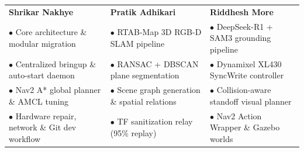 \documentclass[8pt,a4paper]{article}
\begin{document}
\begin{tcolorbox}[title={Team Contributions \& Work Package Breakdown}, colback=white]
    \begin{tabularx}{\textwidth}{@{} X X X @{}}
        \textbf{\color{steelBlue}\fontsize{7.2}{8.2}\selectfont Shrikar Nakhye} & 
        \textbf{\color{steelBlue}\fontsize{7.2}{8.2}\selectfont Pratik Adhikari} & 
        \textbf{\color{steelBlue}\fontsize{7.2}{8.2}\selectfont Riddhesh More} \\
        {\fontsize{6.3}{7.4}\selectfont $\bullet$ Core architecture \& modular migration} & 
        {\fontsize{6.3}{7.4}\selectfont $\bullet$ RTAB-Map 3D RGB-D SLAM pipeline} & 
        {\fontsize{6.3}{7.4}\selectfont $\bullet$ DeepSeek-R1 + SAM3 grounding pipeline} \\
        {\fontsize{6.3}{7.4}\selectfont $\bullet$ Centralized bringup \& auto-start daemon} & 
        {\fontsize{6.3}{7.4}\selectfont $\bullet$ RANSAC + DBSCAN plane segmentation} & 
        {\fontsize{6.3}{7.4}\selectfont $\bullet$ Dynamixel XL430 SyncWrite controller} \\
        {\fontsize{6.3}{7.4}\selectfont $\bullet$ Nav2 A* global planner \& AMCL tuning} & 
        {\fontsize{6.3}{7.4}\selectfont $\bullet$ Scene graph generation \& spatial relations} & 
        {\fontsize{6.3}{7.4}\selectfont $\bullet$ Collision-aware standoff visual planner} \\
        {\fontsize{6.3}{7.4}\selectfont $\bullet$ Hardware repair, network \& Git dev workflow} & 
        {\fontsize{6.3}{7.4}\selectfont $\bullet$ TF sanitization relay (95\% replay)} & 
        {\fontsize{6.3}{7.4}\selectfont $\bullet$ Nav2 Action Wrapper \& Gazebo worlds} \\
    \end{tabularx}
\end{tcolorbox}
\end{document}

